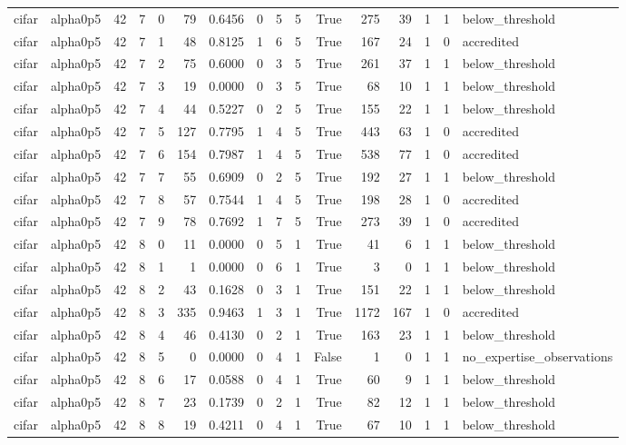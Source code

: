 \begin{tabular}{llrrrrrrrrrrrrrl}
cifar & alpha0p5 & 42 & 7 & 0 & 79 & 0.6456 & 0 & 5 & 5 & True & 275 & 39 & 1 & 1 & below\_threshold \\
cifar & alpha0p5 & 42 & 7 & 1 & 48 & 0.8125 & 1 & 6 & 5 & True & 167 & 24 & 1 & 0 & accredited \\
cifar & alpha0p5 & 42 & 7 & 2 & 75 & 0.6000 & 0 & 3 & 5 & True & 261 & 37 & 1 & 1 & below\_threshold \\
cifar & alpha0p5 & 42 & 7 & 3 & 19 & 0.0000 & 0 & 3 & 5 & True & 68 & 10 & 1 & 1 & below\_threshold \\
cifar & alpha0p5 & 42 & 7 & 4 & 44 & 0.5227 & 0 & 2 & 5 & True & 155 & 22 & 1 & 1 & below\_threshold \\
cifar & alpha0p5 & 42 & 7 & 5 & 127 & 0.7795 & 1 & 4 & 5 & True & 443 & 63 & 1 & 0 & accredited \\
cifar & alpha0p5 & 42 & 7 & 6 & 154 & 0.7987 & 1 & 4 & 5 & True & 538 & 77 & 1 & 0 & accredited \\
cifar & alpha0p5 & 42 & 7 & 7 & 55 & 0.6909 & 0 & 2 & 5 & True & 192 & 27 & 1 & 1 & below\_threshold \\
cifar & alpha0p5 & 42 & 7 & 8 & 57 & 0.7544 & 1 & 4 & 5 & True & 198 & 28 & 1 & 0 & accredited \\
cifar & alpha0p5 & 42 & 7 & 9 & 78 & 0.7692 & 1 & 7 & 5 & True & 273 & 39 & 1 & 0 & accredited \\
cifar & alpha0p5 & 42 & 8 & 0 & 11 & 0.0000 & 0 & 5 & 1 & True & 41 & 6 & 1 & 1 & below\_threshold \\
cifar & alpha0p5 & 42 & 8 & 1 & 1 & 0.0000 & 0 & 6 & 1 & True & 3 & 0 & 1 & 1 & below\_threshold \\
cifar & alpha0p5 & 42 & 8 & 2 & 43 & 0.1628 & 0 & 3 & 1 & True & 151 & 22 & 1 & 1 & below\_threshold \\
cifar & alpha0p5 & 42 & 8 & 3 & 335 & 0.9463 & 1 & 3 & 1 & True & 1172 & 167 & 1 & 0 & accredited \\
cifar & alpha0p5 & 42 & 8 & 4 & 46 & 0.4130 & 0 & 2 & 1 & True & 163 & 23 & 1 & 1 & below\_threshold \\
cifar & alpha0p5 & 42 & 8 & 5 & 0 & 0.0000 & 0 & 4 & 1 & False & 1 & 0 & 1 & 1 & no\_expertise\_observations \\
cifar & alpha0p5 & 42 & 8 & 6 & 17 & 0.0588 & 0 & 4 & 1 & True & 60 & 9 & 1 & 1 & below\_threshold \\
cifar & alpha0p5 & 42 & 8 & 7 & 23 & 0.1739 & 0 & 2 & 1 & True & 82 & 12 & 1 & 1 & below\_threshold \\
cifar & alpha0p5 & 42 & 8 & 8 & 19 & 0.4211 & 0 & 4 & 1 & True & 67 & 10 & 1 & 1 & below\_threshold \\

\end{tabular}
